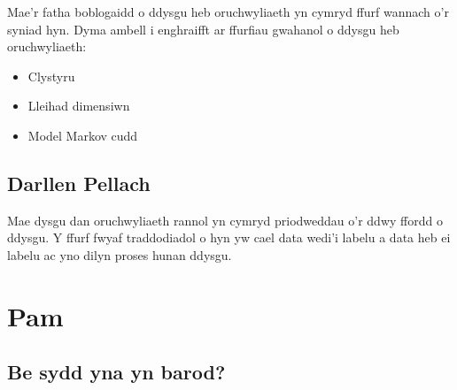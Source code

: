 Mae'r fatha boblogaidd o ddysgu heb oruchwyliaeth yn cymryd ffurf wannach o'r syniad hyn. Dyma ambell i enghraifft ar ffurfiau gwahanol o ddysgu heb oruchwyliaeth:

\begin{itemize}
	\item Clystyru
	\item Lleihad dimensiwn
	\item Model Markov cudd
\end{itemize} 

\subsection{Darllen Pellach}

Mae dysgu dan oruchwyliaeth rannol yn cymryd priodweddau o'r ddwy ffordd o ddysgu. Y ffurf fwyaf traddodiadol o hyn yw cael data wedi'i labelu a data heb ei labelu ac yno dilyn proses hunan ddysgu.


\section{Pam}

\subsection{Be sydd yna yn barod?}

